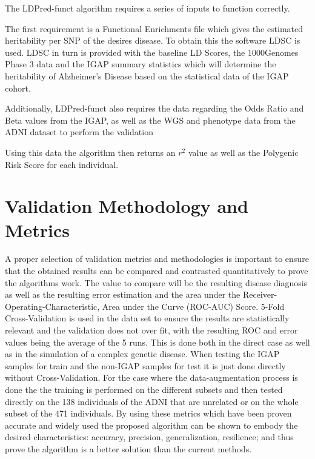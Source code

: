 The LDPred-funct algorithm requires a series of inputs to function correctly.

The first requirement is a Functional Enrichments file which gives the estimated heritability per SNP of the desires disease. To obtain this the software LDSC is used. LDSC in turn is provided with the baseline LD Scores\cite{Finucane2015}, the 1000Genomes Phase 3 data \cite{Consortium2015} and the IGAP summary statistics which will determine the heritability of Alzheimer's Disease based on the statistical data of the IGAP cohort.

Additionally, LDPred-funct also requires the data regarding the Odds Ratio and Beta values from the IGAP, as well as the WGS and phenotype data from the ADNI dataset to perform the validation 

Using this data the algorithm then returns an $r^2$ value as well as the Polygenic Risk Score for each individual.

\section{Validation Methodology and Metrics}


A proper selection of validation metrics and methodologies is important to ensure that the obtained results can be compared and contrasted quantitatively to prove the algorithms work. The value to compare will be the resulting disease diagnosis as well as the resulting error estimation and  the area under the Receiver-Operating-Characteristic, Area under the Curve (ROC-AUC) Score. 5-Fold Cross-Validation is used in the data set to ensure the results are statistically relevant and the validation does not over fit, with the resulting ROC and error values being the average of the 5 runs. This is done both in the direct case as well as in the simulation of a complex genetic disease. When testing the IGAP samples for train and the non-IGAP samples for test it is just done directly without Cross-Validation. For the case where the data-augmentation process is done the the training is performed on the different subsets and then tested directly on the 138 individuals of the ADNI that are unrelated or on the whole subset of the 471 individuals. By using these metrics which have been proven accurate and widely used the proposed algorithm can be shown to embody the desired characteristics: accuracy, precision, generalization, resilience; and thus prove the algorithm is a better solution than the current methods.
